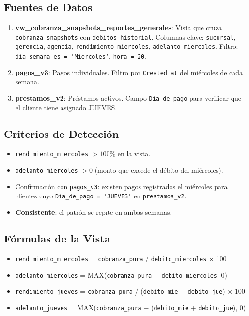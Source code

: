 \documentclass[11pt,a4paper]{article}
\begin{document}
\subsection{Fuentes de Datos}

\begin{enumerate}[leftmargin=2em]
  \item \textbf{vw\_cobranza\_snapshots\_reportes\_generales}: Vista que cruza
    \texttt{cobranza\_snapshots} con \texttt{debitos\_historial}. Columnas clave:
    \texttt{sucursal}, \texttt{gerencia}, \texttt{agencia}, \texttt{rendimiento\_miercoles},
    \texttt{adelanto\_miercoles}. Filtro: \texttt{dia\_semana\_es = 'Miercoles'}, \texttt{hora = 20}.
  \item \textbf{pagos\_v3}: Pagos individuales. Filtro por \texttt{Created\_at} del mi\'ercoles
    de cada semana.
  \item \textbf{prestamos\_v2}: Pr\'estamos activos. Campo \texttt{Dia\_de\_pago} para verificar
    que el cliente tiene asignado JUEVES.
\end{enumerate}

\subsection{Criterios de Detecci\'on}

\begin{itemize}[leftmargin=2em]
  \item \texttt{rendimiento\_miercoles} $> 100\%$ en la vista.
  \item \texttt{adelanto\_miercoles} $> 0$ (monto que excede el d\'ebito del mi\'ercoles).
  \item Confirmaci\'on con \texttt{pagos\_v3}: existen pagos registrados el mi\'ercoles para
    clientes cuyo \texttt{Dia\_de\_pago = 'JUEVES'} en \texttt{prestamos\_v2}.
  \item \textbf{Consistente}: el patr\'on se repite en ambas semanas.
\end{itemize}

\subsection{F\'ormulas de la Vista}

\begin{itemize}[leftmargin=2em]
  \item \texttt{rendimiento\_miercoles} = \texttt{cobranza\_pura} / \texttt{debito\_miercoles} $\times$ 100
  \item \texttt{adelanto\_miercoles} = MAX(\texttt{cobranza\_pura} $-$ \texttt{debito\_miercoles}, 0)
  \item \texttt{rendimiento\_jueves} = \texttt{cobranza\_pura} / (\texttt{debito\_mie} + \texttt{debito\_jue}) $\times$ 100
  \item \texttt{adelanto\_jueves} = MAX(\texttt{cobranza\_pura} $-$ (\texttt{debito\_mie} + \texttt{debito\_jue}), 0)
\end{itemize}
\end{document}

